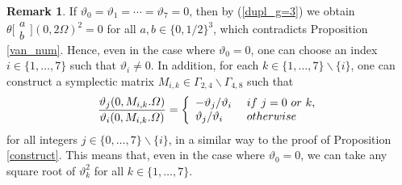 \documentclass{amsart}
\theoremstyle{definition}
\newtheorem{Rmk}[Def]{Remark}
\theoremstyle{plain}
\begin{document}
\begin{Rmk}\label{0vanish}
{If $\vartheta_0 = \vartheta_1 = \cdots = \vartheta_7 = 0$, then by (\ref{dupl_g=3}) we obtain $\theta\bigl[\begin{smallmatrix}a\\b\end{smallmatrix}\bigr](0,2\varOmega)^2 = 0$ for all $a,b \in \{0,1/2\}^3$, which contradicts Proposition \ref{van_num}.
Hence, even in the case where $\vartheta_0=0$, one can choose an index $i \in \{1,\ldots,7\}$ such that $\vartheta_i \neq 0$.
In addition, for each $k \in \{1,\ldots,7\}\!\smallsetminus\!\{i\}$, one can construct a symplectic matrix $M_{i,k} \in \varGamma_{2,4}\!\smallsetminus\!\varGamma_{4,8}$ such that
\[
    \frac{\vartheta_j(0,M_{i,k}.\varOmega)}{\vartheta_i(0,M_{i,k}.\varOmega)} = \left\{
    \begin{array}{ll}
        -\vartheta_j/\vartheta_i \ & {\rm if}\ j = 0\ {\rm or}\ k,\\
        \vartheta_j/\vartheta_i \ & {\rm otherwise}
    \end{array}
    \right.\medskip
\]
for all integers $j \in \{0,\ldots,7\}\!\smallsetminus\!\{i\}$, in a similar way to the proof of Proposition \ref{construct}.
This means that, even in the case where $\vartheta_0=0$, we can take any square root of $\vartheta_k^2$ for all $k \in \{1,\ldots,7\}$.}
\end{Rmk}
\end{document}
